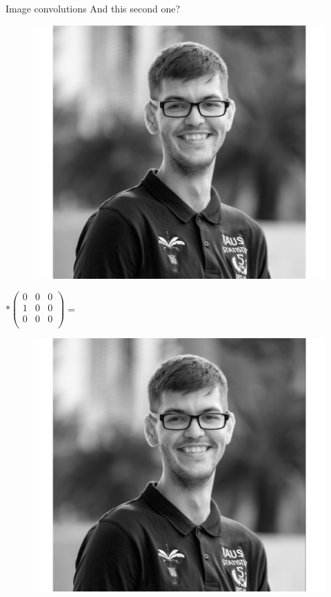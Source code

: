 \documentclass{beamer}
\begin{document}
\begin{frame}{Image convolutions}
And this second one?

\begin{minipage}{0.32\linewidth}
\begin{figure}
\includegraphics[width=\linewidth]{Images/conv1.png}
\end{figure}

\end{minipage}
\begin{minipage}{0.32\linewidth}
$ * \begin{pmatrix}
0& 0 & 0 \\
1& 0 & 0 \\
0& 0 & 0 \\
\end{pmatrix} =$
\end{minipage}
\begin{minipage}{0.32\linewidth}
\begin{figure}
\includegraphics[width=\linewidth]{Images/conv3.png}
\end{figure}
\end{minipage}
\end{frame}
\end{document}
